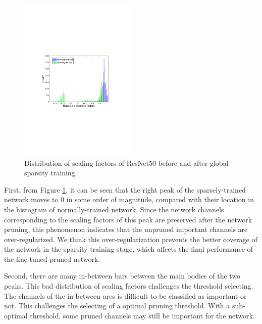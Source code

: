 \documentclass[review]{cvpr}
\begin{document}
 
\begin{figure}[h!]

	\begin{centering}
		\includegraphics[width=0.5\textwidth]{figure/problem_cropped.pdf} 
 
		\caption{Distribution of scaling factors of ResNet50 before and after global sparsity training.}
		\label{pbm}
 
	\par\end{centering}

\end{figure}
 

First, from Figure \ref{pbm}, it can be seen that the right peak of the sparsely-trained network moves to 0 in some order of magnitude, compared with their location in the histogram of normally-trained network. Since the network channels corresponding to the scaling factors of this peak are preserved after the network pruning, this phenomenon indicates that the unpruned important channels are over-regularized.  We think this over-regularization prevents the better coverage of the network in the sparsity training stage, which affects the final performance of the fine-tuned pruned network.
 
Second, there are many in-between bars between the main bodies of the two peaks. This bad distribution of scaling factors challenges the threshold selecting. The channels of the in-between ares is difficult to be classified as important or not. This challenges the selecting of a optimal pruning threshold. With a sub-optimal threshold, some pruned channels may still be important for the network.
\end{document}
